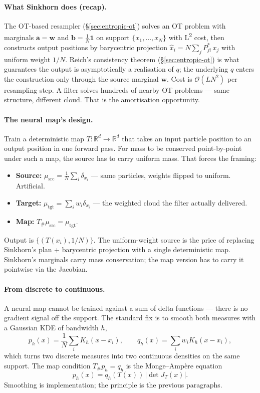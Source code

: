 \documentclass{article}
\begin{document}
\paragraph{What Sinkhorn does (recap).}
The OT-based resampler (\S\ref{sec:entropic-ot}) solves an OT problem with marginals $\mathbf{a} = \mathbf{w}$ and $\mathbf{b} = \tfrac{1}{N}\mathbf{1}$ on support $\{x_1, \ldots, x_N\}$ with L\textsuperscript{2} cost, then constructs output positions by barycentric projection $\hat x_i = N\sum_j P^*_{ji}\, x_j$ with uniform weight $1/N$. Reich's consistency theorem (\S\ref{sec:entropic-ot}) is what guarantees the output is asymptotically a realisation of $q$; the underlying $q$ enters the construction only through the source marginal $\mathbf{w}$. Cost is $\mathcal{O}(LN^2)$ per resampling step. A filter solves hundreds of nearby OT problems --- same structure, different cloud. That is the amortisation opportunity.

\paragraph{The neural map's design.}
Train a deterministic map $T : \mathbb{R}^d \to \mathbb{R}^d$ that takes an input particle position to an output position in one forward pass. For mass to be conserved point-by-point under such a map, the source has to carry uniform mass. That forces the framing:
\begin{itemize}
\item \textbf{Source:} $\mu_{\text{src}} = \tfrac{1}{N}\sum_i \delta_{x_i}$ --- same particles, weights flipped to uniform. Artificial.
\item \textbf{Target:} $\mu_{\text{tgt}} = \sum_i w_i \delta_{x_i}$ --- the weighted cloud the filter actually delivered.
\item \textbf{Map:} $T_\#\mu_{\text{src}} = \mu_{\text{tgt}}$.
\end{itemize}
Output is $\{(T(x_i), 1/N)\}$. The uniform-weight source is the price of replacing Sinkhorn's plan + barycentric projection with a single deterministic map. Sinkhorn's marginals carry mass conservation; the map version has to carry it pointwise via the Jacobian.

\paragraph{From discrete to continuous.}
A neural map cannot be trained against a sum of delta functions --- there is no gradient signal off the support. The standard fix is to smooth both measures with a Gaussian KDE of bandwidth $h$,
\begin{equation}
p_h(x) = \frac{1}{N}\sum_i K_h(x - x_i), \qquad
q_h(x) = \sum_i w_i K_h(x - x_i),
\end{equation}
which turns two discrete measures into two continuous densities on the same support. The map condition $T_\# p_h = q_h$ is the Monge--Amp\`ere equation
\begin{equation}
p_h(x) = q_h(T(x))\,\left|\det J_T(x)\right|.
\end{equation}
Smoothing is implementation; the principle is the previous paragraphs.
\end{document}
